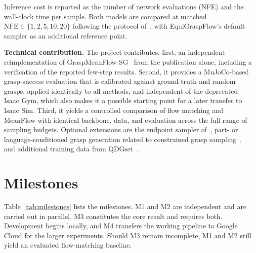 \documentclass[conference]{IEEEtran}
\begin{document}
Inference cost is reported as the number of network evaluations (NFE) and the wall-clock time per sample. Both
models are compared at matched $\text{NFE} \in \{1, 2, 5, 10, 20\}$ following the protocol
of~\cite{kwon2026graspmeanflow}, with EquiGraspFlow's default sampler as an additional reference point.

\textbf{Technical contribution.} The project contributes, first, an independent reimplementation of
GraspMeanFlow-SG~\cite{kwon2026graspmeanflow} from the publication alone, including a verification of the reported
few-step results. Second, it provides a MuJoCo-based grasp-success evaluation that is calibrated against
ground-truth and random grasps, applied identically to all methods, and independent of the deprecated Isaac Gym,
which also makes it a possible starting point for a later transfer to Isaac Sim. Third, it yields a controlled
comparison of flow matching and MeanFlow with identical backbone, data, and evaluation across the full range of
sampling budgets. Optional extensions are the endpoint sampler of~\cite{kwon2026graspmeanflow}, part- or
language-conditioned grasp generation related to constrained grasp sampling~\cite{lundell2023constrained}, and
additional training data from QDGset~\cite{huber2024qdgset}.

\section{Milestones}

Table~\ref{tab:milestones} lists the milestones. M1 and M2 are independent and are carried out in parallel. M3
constitutes the core result and requires both. Development begins locally, and M4 transfers the working pipeline to
Google Cloud for the larger experiments. Should M3 remain incomplete, M1 and M2 still yield an evaluated
flow-matching baseline.




\end{document}
